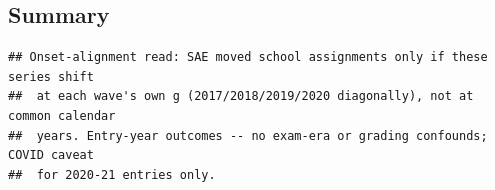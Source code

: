 \documentclass[
]{article}
\begin{document}
\hypertarget{summary}{%
\subsection{Summary}\label{summary}}

\begin{verbatim}
## Onset-alignment read: SAE moved school assignments only if these series shift
##  at each wave's own g (2017/2018/2019/2020 diagonally), not at common calendar
##  years. Entry-year outcomes -- no exam-era or grading confounds; COVID caveat
##  for 2020-21 entries only.
\end{verbatim}
\end{document}
